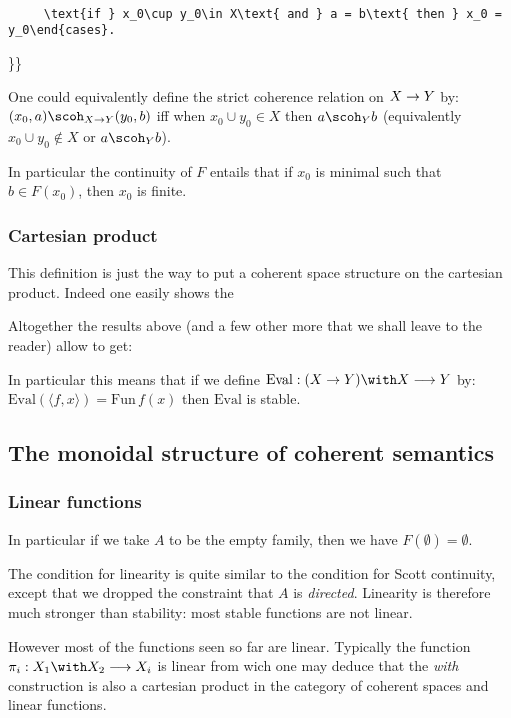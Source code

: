 \texttt{~~~~~~~~~~~~~~~~~~~~~~~~~~~~~~~~~~~~~~~~~~~~~~~~~~~~~~~~~~~~~~~~~~~~~~~~~~~\textbackslash{}text\{if~\}~x\_0\textbackslash{}cup~y\_0\textbackslash{}in~X\textbackslash{}text\{~and~\}~a~=~b\textbackslash{}text\{~then~\}~x\_0~=~y\_0\textbackslash{}end\{cases\}}\texttt{.}

\}\}

One could equivalently define the strict coherence relation on
\(X\rightarrow Y\) by: \((x_0,a)\scoh_{X\imp Y}(y_0, b)\) iff when
\(x_0\cup y_0\in X\) then \(a\scoh_Y b\) (equivalently
\(x_0\cup y_0\not\in X\) or \(a\scoh_Y b\)).

In particular the continuity of \(F\) entails that if \(x_0\) is minimal
such that \(b\in F(x_0)\), then \(x_0\) is finite.

\subsubsection{Cartesian product}\label{cartesian-product}

This definition is just the way to put a coherent space structure on the
cartesian product. Indeed one easily shows the

Altogether the results above (and a few other more that we shall leave
to the reader) allow to get:

In particular this means that if we define
\(\mathrm{Eval}:(X\imp Y)\with X\longrightarrow Y\) by:
\(\mathrm{Eval}(\langle f, x\rangle) = \mathrm{Fun}\,f(x)\) then
\(\mathrm{Eval}\) is stable.

\subsection{The monoidal structure of coherent
semantics}\label{the-monoidal-structure-of-coherent-semantics}

\subsubsection{Linear functions}\label{linear-functions}

In particular if we take \(A\) to be the empty family, then we have
\(F(\emptyset) = \emptyset\).

The condition for linearity is quite similar to the condition for Scott
continuity, except that we dropped the constraint that \(A\) is
\emph{directed}. Linearity is therefore much stronger than stability:
most stable functions are not linear.

However most of the functions seen so far are linear. Typically the
function \(\pi_i:X_1\with X_2\longrightarrow X_i\) is linear from wich
one may deduce that the \emph{with} construction is also a cartesian
product in the category of coherent spaces and linear functions.

